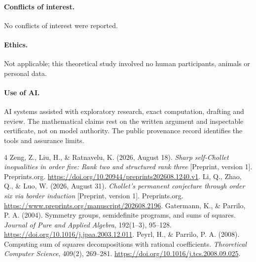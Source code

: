\documentclass[11pt,a4paper]{article}
\theoremstyle{remark}\newtheorem{remark}[theorem]{Remark}
\begin{document}
\paragraph{Conflicts of interest.} No conflicts of interest were reported.
\paragraph{Ethics.} Not applicable; this theoretical study involved no human participants, animals or personal data.
\paragraph{Use of AI.} AI systems assisted with exploratory research, exact computation, drafting and review. The mathematical claims rest on the written argument and inspectable certificate, not on model authority. The public provenance record identifies the tools and assurance limits.

\begin{thebibliography}{4}
Zeng, Z., Liu, H., \& Ratnavelu, K. (2026, August 18).
\emph{Sharp self-Chollet inequalities in order five: Rank two and structured rank three}
[Preprint, version 1]. Preprints.org.
\url{https://doi.org/10.20944/preprints202608.1240.v1}.
Li, Q., Zhao, Q., \& Luo, W. (2026, August 31).
\emph{Chollet's permanent conjecture through order six via border induction}
[Preprint, version 1]. Preprints.org.
\url{https://www.preprints.org/manuscript/202608.2196}.
Gatermann, K., \& Parrilo, P. A. (2004).
Symmetry groups, semidefinite programs, and sums of squares.
\emph{Journal of Pure and Applied Algebra}, 192(1--3), 95--128.
\url{https://doi.org/10.1016/j.jpaa.2003.12.011}.
Peyrl, H., \& Parrilo, P. A. (2008).
Computing sum of squares decompositions with rational coefficients.
\emph{Theoretical Computer Science}, 409(2), 269--281.
\url{https://doi.org/10.1016/j.tcs.2008.09.025}.
\end{thebibliography}
\end{document}
